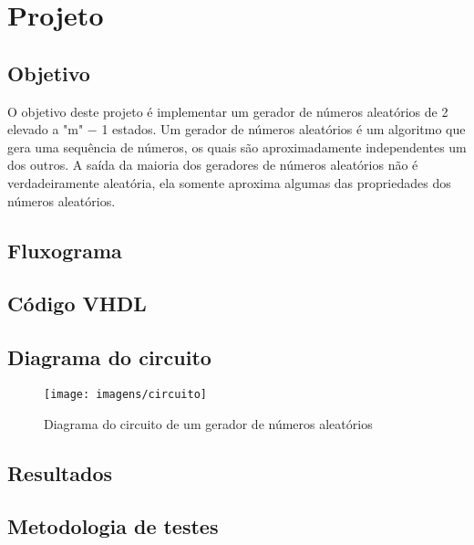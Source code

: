 \documentclass[12pts]{article}
\begin{document}
\section{Projeto}
\iffalse
Parte Experimental, descrevendo os passos realizados, dificuldades e soluções para os problemas encontrados. Aqui, deve-se apresentar uma descrição dos resultados encontrados em forma de figuras, gráficos e tabelas.
\fi

\singlespacing

\subsection{Objetivo}
	O objetivo deste projeto é implementar um gerador de números aleatórios de 2 elevado a "m" − 1 estados.	Um gerador de números aleatórios é um algoritmo que gera uma sequência de números, os quais são aproximadamente independentes um dos outros. A saída da maioria dos geradores de números
aleatórios não é verdadeiramente aleatória, ela somente aproxima algumas das propriedades dos
números aleatórios.
	
\subsection{Fluxograma}

\clearpage
\subsection{Código VHDL}


\clearpage
\subsection{Diagrama do circuito}
\begin{figure}[!htb]
  \centering
  \texttt{[image: imagens/circuito]}
  \caption{Diagrama do circuito de um gerador de números aleatórios}	
  \label{figRotulo}
\end{figure}

\newpage

\subsection{Resultados}

\subsection{Metodologia de testes}
\end{document}
